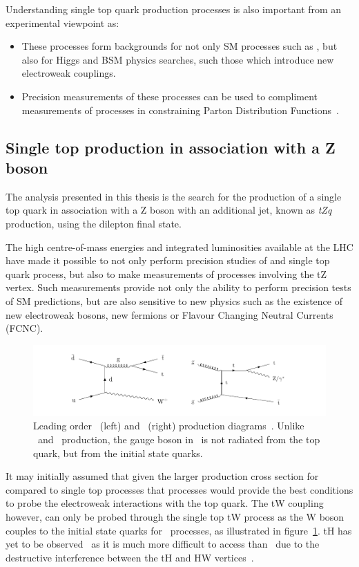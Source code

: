 Understanding single top quark production processes is also important from an experimental viewpoint as:
\begin{itemize}
\item These processes form backgrounds for not only SM processes such as \ttbar, but also for Higgs and BSM physics searches, such those which introduce new electroweak couplings.
\item Precision measurements of these processes can be used to compliment measurements of \ttbar processes in constraining Parton Distribution Functions~\cite{Guffanti:2010yu}.
\end{itemize}


\subsection{Single top production in association with a Z boson}\label{subsec:tZqTheory}
The analysis presented in this thesis is the search for the production of a single top quark in association with a Z boson with an additional jet, known as \emph{tZq} production, using the dilepton final state.

The high centre-of-mass energies and integrated luminosities available at the LHC have made it possible to not only perform precision studies of \ttbar and single top quark process, but also to make measurements of processes involving the tZ vertex.
Such measurements provide not only the ability to perform precision tests of SM predictions, but are also sensitive to new physics such as the existence of new electroweak bosons, new fermions or Flavour Changing Neutral Currents (FCNC).

\begin{figure}[htbp]
\centering
\includegraphics[width=\textwidth]{figs/top-physics/CMS-TOP-17-005_Figure_001.pdf}
\caption{Leading order \ttW~(left) and \ttZ~(right) production diagrams~\cite{Sirunyan:2017uzs}. Unlike \ttZ~and \ttH~production, the gauge boson in \ttW~is not radiated from the top quark, but from the initial state quarks.}
\label{fig:feyn_ttV}
\end{figure}

It may initially assumed that given the larger production cross section for \ttbar compared to single top processes that \ttbar processes would provide the best conditions to probe the electroweak interactions with the top quark.
The tW coupling however, can only be probed through the single top tW process as the W boson couples to the initial state quarks for \ttW~processes, as illustrated in figure~\ref{fig:feyn_ttV}.
tH has yet to be observed~\cite{CMS:2018jsz} as it is much more difficult to access than \ttH~due to the destructive interference between the tH and HW vertices~\cite{Maltoni:2001hu}.

